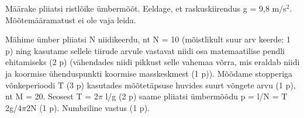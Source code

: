 
Määrake pliiatsi ristlõike ümbermõõt. Eeldage, et raskuskiirendus g = 9,8 m/s$^2$. Mõõtemääramatust ei ole vaja leida.

\hint

\solu
Mähime ümber pliiatsi N niidikeerdu, nt N = 10 (mõistlikult suur arv keerde: 1 p) ning kasutame sellele tiirude arvule vastavat niidi osa matemaatilise pendli ehitamiseks (2 p) (vähendades niidi pikkust selle vahemaa võrra, mis eraldab niidi ja koormise ühenduspunkti koormise masskeskmest (1 p)). Mõõdame stopperiga võnkeperioodi T (3 p) kasutades mõõtetäpsuse huvides suurt võngete arvu (1 p), nt M = 20. Seosest T = 2$\pi$ l/g (2 p) saame pliiatsi ümbermõõdu p = l/N = T 2g/4$\pi$2N (1 p). Numbriline vastus (1 p).
\probend
